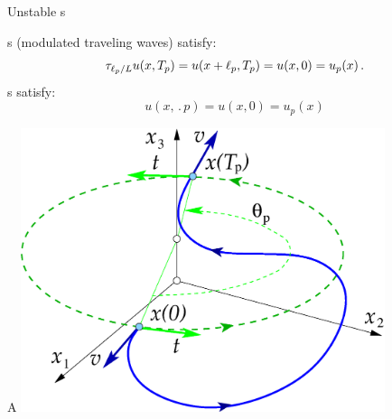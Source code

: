 \documentclass{beamer}
\begin{document}
\begin{frame}{Unstable \rpo s}


\Rpo s (modulated traveling waves) satisfy:
\[
  \tau_{\ell_p/L}u(x,{T_{p}}) =
  u(x+\ell_p,{T_{p}}) = u(x,0) = u_p(x)\,.
\]
\Po s satisfy:
\[
   u(x,\period{p}) = u(x,0)=u_p(x)
\]

\end{frame}

\begin{frame}{A \rpo}
\includegraphics[width=0.8\textwidth,clip=true]{../../figs/rpo}
\end{frame}
\end{document}
